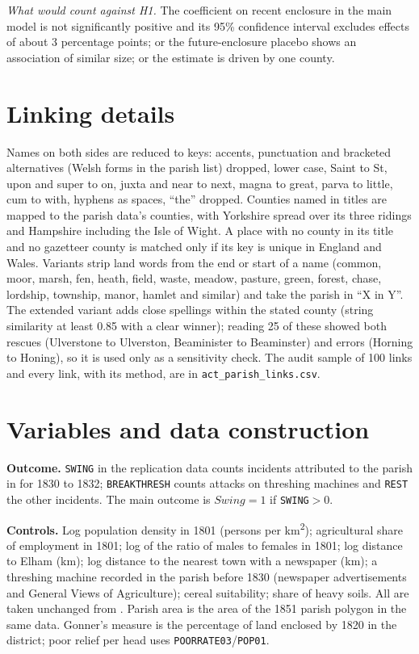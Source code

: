 \documentclass[11pt,a4paper]{article}
\begin{document}
\begin{small}
\textit{What would count against H1.} The coefficient on recent enclosure in the main model is not significantly positive and its 95\% confidence interval excludes effects of about 3 percentage points; or the future-enclosure placebo shows an association of similar size; or the estimate is driven by one county.
\end{small}

\section{Linking details}\label{app:link}
Names on both sides are reduced to keys: accents, punctuation and bracketed alternatives (Welsh forms in the parish list) dropped, lower case, Saint to St, upon and super to on, juxta and near to next, magna to great, parva to little, cum to with, hyphens as spaces, ``the'' dropped. Counties named in titles are mapped to the parish data's counties, with Yorkshire spread over its three ridings and Hampshire including the Isle of Wight. A place with no county in its title and no gazetteer county is matched only if its key is unique in England and Wales. Variants strip land words from the end or start of a name (common, moor, marsh, fen, heath, field, waste, meadow, pasture, green, forest, chase, lordship, township, manor, hamlet and similar) and take the parish in ``X in Y''. The extended variant adds close spellings within the stated county (string similarity at least 0.85 with a clear winner); reading 25 of these showed both rescues (Ulverstone to Ulverston, Beaminister to Beaminster) and errors (Horning to Honing), so it is used only as a sensitivity check. The audit sample of 100 links and every link, with its method, are in \texttt{act\_parish\_links.csv}.

\section{Variables and data construction}\label{app:vars}
\textbf{Outcome.} \texttt{SWING} in the replication data counts incidents attributed to the parish in \citet{holland2005} for 1830 to 1832; \texttt{BREAKTHRESH} counts attacks on threshing machines and \texttt{REST} the other incidents. The main outcome is $\textit{Swing}=1$ if \texttt{SWING}$>0$.

\textbf{Controls.} Log population density in 1801 (persons per km\textsuperscript{2}); agricultural share of employment in 1801; log of the ratio of males to females in 1801; log distance to Elham (km); log distance to the nearest town with a newspaper (km); a threshing machine recorded in the parish before 1830 (newspaper advertisements and General Views of Agriculture); cereal suitability; share of heavy soils. All are taken unchanged from \citet{caprettinivoth2020data}. Parish area is the area of the 1851 parish polygon in the same data. Gonner's measure is the percentage of land enclosed by 1820 in the district; poor relief per head uses \texttt{POORRATE03}/\texttt{POP01}.
\end{document}
